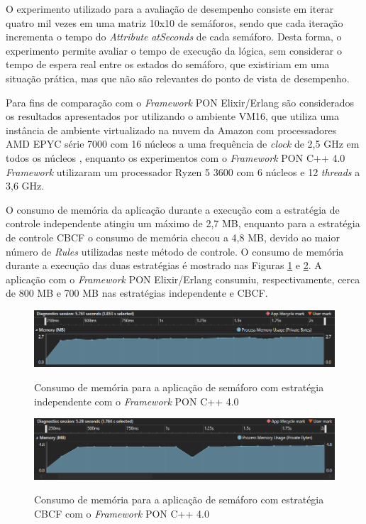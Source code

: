 \FloatBarrier

O experimento utilizado para a avaliação de desempenho consiste em iterar quatro
mil vezes em uma matriz 10x10 de semáforos, sendo que cada iteração incrementa o
tempo do \textit{Attribute} \textit{atSeconds} de cada semáforo. Desta forma, o
experimento permite avaliar o tempo de execução da lógica, sem considerar o
tempo de espera real entre os estados do semáforo, que existiriam em uma
situação prática, mas que não são relevantes do ponto de vista de desempenho.

Para fins de comparação com o \textit{Framework} PON Elixir/Erlang são
considerados os resultados apresentados por 
utilizando o ambiente VM16, que utiliza uma instância de ambiente virtualizado
na nuvem da Amazon com processadores AMD EPYC série 7000 com 16 núcleos a uma
frequência de \textit{clock} de 2,5 GHz em todos os núcleos
\cite{msc_negrini_2019}, enquanto os experimentos com o \textit{Framework} PON
C++ 4.0 \textit{Framework} utilizaram um processador Ryzen 5 3600 com 6 núcleos
e 12 \textit{threads} a 3,6 GHz.

\FloatBarrier

O consumo de memória da aplicação durante a execução com a estratégia de
controle independente atingiu um máximo de 2,7 MB, enquanto para a estratégia de
controle CBCF o consumo de memória checou a 4,8 MB, devido ao maior número de
\textit{Rules} utilizadas neste método de controle. O consumo de memória durante
a execução das duas estratégias é mostrado nas Figuras \ref{fig:mem_cta} e
\ref{fig:mem_cbcf}. A aplicação com o \textit{Framework} PON Elixir/Erlang
consumiu, respectivamente, cerca de 800 MB e 700 MB nas estratégias independente
e CBCF.

\begin{figure}[!htb]
\centering
\caption{Consumo de memória para a aplicação de semáforo com estratégia
independente com o \textit{Framework} PON C++ 4.0}
\smallskip
\includegraphics[width=\textwidth]{../figures/cta_mem.png}
\label{fig:mem_cta}
\end{figure}

\begin{figure}[!htb]
\centering
\caption{Consumo de memória para a aplicação de semáforo com estratégia CBCF com
o \textit{Framework} PON C++ 4.0}
\smallskip
\includegraphics[width=\textwidth]{../figures/cbcl_mem.png}
\label{fig:mem_cbcf}
\end{figure}

